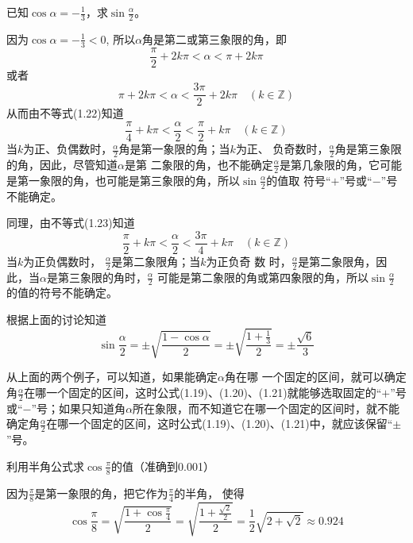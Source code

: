 \begin{example}
    已知$\cos\alpha=-\frac{1}{3}$，求$\sin\frac{\alpha}{2}$。
\end{example}

\begin{solution}
因为$\cos\alpha=-\frac{1}{3}<0$, 所以$\alpha$角是第二或第三象限的角，即
\begin{equation}
    \frac{\pi}{2}+2k\pi<\alpha<\pi+2k\pi
\end{equation}
或者
\begin{equation}
    \pi+2k\pi<\alpha<\frac{3\pi}{2}+2k\pi\quad (k\in\mathbb{Z})
\end{equation}
从而由不等式(1.22)知道
\[\frac{\pi}{4}+k\pi<\frac{\alpha}{2}<\frac{\pi}{2}+k\pi \quad (k\in\mathbb{Z}) \]
当$k$为正、负偶数时，$\frac{\alpha}{2}$角是第一象限的角；当$k$为正、
负奇数时，$\frac{\alpha}{2}$角是第三象限的角，因此，尽管知道$\alpha$是第
二象限的角，也不能确定$\frac{\alpha}{2}$是第几象限的角，它可能是第一象限的角，也可能是第三象限的角，所以$\sin \frac{\alpha}{2}$的值取
符号“$+$”号或“$-$”号不能确定。

同理，由不等式(1.23)知道
\[\frac{\pi}{2}+k\pi<\frac{\alpha}{2}<\frac{3\pi}{4}+k\pi\quad (k\in\mathbb{Z})\]
当$k$为正负偶数时，
$\frac{\alpha}{2}$是第二象限角；当$k$为正负奇 数
时，$\frac{\alpha}{2}$是第二象限角，因此，当$\alpha$是第三象限的角时，$\frac{\alpha}{2}$
可能是第二象限的角或第四象限的角，所以$\sin\frac{\alpha}{2}$
的值的符号不能确定。

根据上面的讨论知道
\[\sin\frac{\alpha}{2}=\pm\sqrt{\frac{1-\cos\alpha}{2}}=\pm\sqrt{\frac{1+\frac{1}{3}}{2}}=\pm\frac{\sqrt{6}}{3}\]
\end{solution}

从上面的两个例子，可以知道，如果能确定$\alpha$角在哪
一个固定的区间，就可以确定角$\frac{\alpha}{2}$在哪一个固定的区间，这时公式(1.19)、(1.20)、(1.21)就能够选取固定的“$+$”号或“$-$”号；如果只知道角$\alpha$所在象限，而不知道它在哪一个固定的区间时，就不能确定角$\frac{\alpha}{2}$在哪一个固定的区间，这时公式(1.19)、(1.20)、(1.21)中，就应该保留“$\pm$”号。
    

\begin{example}
    利用半角公式求$\cos\frac{\pi}{8}$的值（准确到0.001）
\end{example}

\begin{solution}
    因为$\frac{\pi}{8}$是第一象限的角，把它作为$\frac{\pi}{4}$的半角，
    使得
\[\cos\frac{\pi}{8}=\sqrt{\frac{1+\cos\frac{\pi}{4}}{2}}=\sqrt{\frac{1+\frac{\sqrt{2}}{2}}{2}}=\frac{1}{2}\sqrt{2+\sqrt{2}}\approx 0.924\]
\end{solution}


